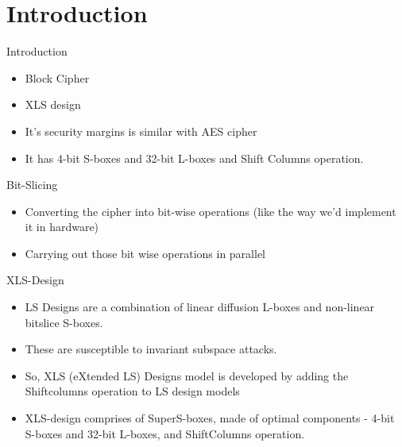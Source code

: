 \section{Introduction}

\begin{frame}{Introduction}
\begin{itemize}
    \item Block Cipher 
    \item XLS design 
    \item It's security margins is similar with AES cipher 
    \item It has 4-bit S-boxes and 32-bit L-boxes and Shift Columns operation.
\end{itemize}
\end{frame}

\begin{frame}{Bit-Slicing}
    \begin{itemize}
        \item Converting the cipher into bit-wise operations (like the way we'd implement it in hardware)
        \item Carrying out those bit wise operations in parallel
    \end{itemize}
\end{frame}

\begin{frame}{XLS-Design}
\begin{itemize}
    \item LS Designs are a combination of linear diffusion L-boxes and non-linear bitslice S-boxes.
    \item These are  susceptible to invariant subspace attacks.
    \item So, XLS (eXtended LS) Designs model is developed by adding the Shiftcolumns operation to LS design models
    \item XLS-design comprises of SuperS-boxes, made of optimal components - 4-bit S-boxes and 32-bit L-boxes, and ShiftColumns operation.
\end{itemize}
\end{frame}

